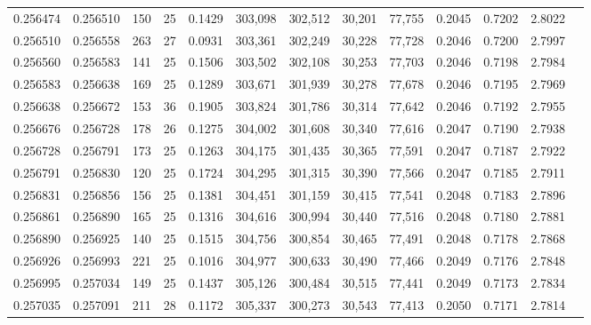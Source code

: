 \begin{tabular}{rrrrrrrrrrrrr}
0.256474 & 0.256510 &   150 &  25 &                                     0.1429 & 303,098 & 302,512 &  30,201 &  77,755 & 0.2045 & 0.7202 & 2.8022 \\
0.256510 & 0.256558 &   263 &  27 &                                     0.0931 & 303,361 & 302,249 &  30,228 &  77,728 & 0.2046 & 0.7200 & 2.7997 \\
0.256560 & 0.256583 &   141 &  25 &                                     0.1506 & 303,502 & 302,108 &  30,253 &  77,703 & 0.2046 & 0.7198 & 2.7984 \\
0.256583 & 0.256638 &   169 &  25 &                                     0.1289 & 303,671 & 301,939 &  30,278 &  77,678 & 0.2046 & 0.7195 & 2.7969 \\
0.256638 & 0.256672 &   153 &  36 &                                     0.1905 & 303,824 & 301,786 &  30,314 &  77,642 & 0.2046 & 0.7192 & 2.7955 \\
0.256676 & 0.256728 &   178 &  26 &                                     0.1275 & 304,002 & 301,608 &  30,340 &  77,616 & 0.2047 & 0.7190 & 2.7938 \\
0.256728 & 0.256791 &   173 &  25 &                                     0.1263 & 304,175 & 301,435 &  30,365 &  77,591 & 0.2047 & 0.7187 & 2.7922 \\
0.256791 & 0.256830 &   120 &  25 &                                     0.1724 & 304,295 & 301,315 &  30,390 &  77,566 & 0.2047 & 0.7185 & 2.7911 \\
0.256831 & 0.256856 &   156 &  25 &                                     0.1381 & 304,451 & 301,159 &  30,415 &  77,541 & 0.2048 & 0.7183 & 2.7896 \\
0.256861 & 0.256890 &   165 &  25 &                                     0.1316 & 304,616 & 300,994 &  30,440 &  77,516 & 0.2048 & 0.7180 & 2.7881 \\
0.256890 & 0.256925 &   140 &  25 &                                     0.1515 & 304,756 & 300,854 &  30,465 &  77,491 & 0.2048 & 0.7178 & 2.7868 \\
0.256926 & 0.256993 &   221 &  25 &                                     0.1016 & 304,977 & 300,633 &  30,490 &  77,466 & 0.2049 & 0.7176 & 2.7848 \\
0.256995 & 0.257034 &   149 &  25 &                                     0.1437 & 305,126 & 300,484 &  30,515 &  77,441 & 0.2049 & 0.7173 & 2.7834 \\
0.257035 & 0.257091 &   211 &  28 &                                     0.1172 & 305,337 & 300,273 &  30,543 &  77,413 & 0.2050 & 0.7171 & 2.7814 \\

\end{tabular}
